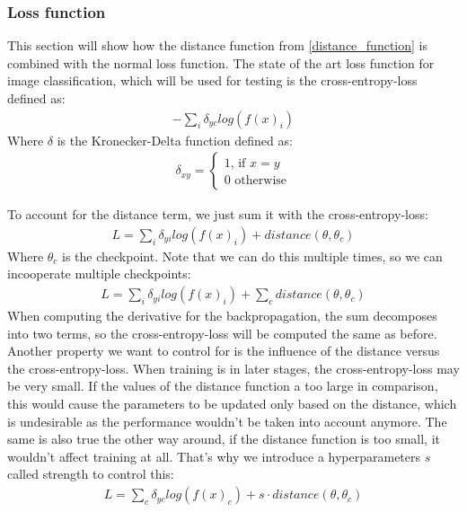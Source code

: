 \subsubsection{Loss function}\label{sub:Loss_function}
This section will show how the distance function from \ref{distance_function} is
combined with the normal loss function. The state of the art loss function for
image classification, which will be used for testing is the cross-entropy-loss
defined as:
\begin{align}
    -\sum_{i} \delta_{yc} log(f(x)_i)
\end{align}
Where $\delta$ is the Kronecker-Delta function defined as:
\begin{align}
    \delta_{xy} =
    \begin{cases}
        1 \textrm{, if } x=y \\
        0 \textrm{ otherwise}
    \end{cases}
\end{align}

To account for the distance term, we just sum it with the cross-entropy-loss:
\begin{align}\label{eq:Loss_distance}
    L=\sum_{i} \delta_{yi} log(f(x)_i) + distance(\theta, \theta_c)
\end{align}
Where $\theta_c$ is the checkpoint.
Note that we can do this multiple times, so we can incooperate multiple
checkpoints:
\begin{align}
    L=\sum_{i} \delta_{yi} log(f(x)_i) + \sum_c distance(\theta, \theta_c)
\end{align}
When computing the derivative for the backpropagation, the sum
decomposes into two terms, so the cross-entropy-loss will be computed the same
as before. Another property we want to control for is the influence of the
distance versus the cross-entropy-loss. When training is in later stages, the
cross-entropy-loss may be very small. If the values of the distance function a
too large in comparison, this would cause the parameters to be updated only
based on the distance, which is undesirable as the performance wouldn't be taken
into account anymore. The same is also true the other way around, if the
distance function is too small, it wouldn't affect training at all. That's why
we introduce a hyperparameters $s$ called strength to control this:
\begin{align}\label{eq:Loss_strength}
    L=\sum_{c} \delta_{yc} log(f(x)_c) + s \cdot distance(\theta, \theta_c)
\end{align}

